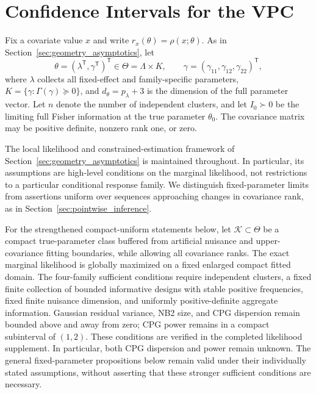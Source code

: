 \section{Confidence Intervals for the VPC}
\label{sec:vpc_confidence}

Fix a covariate value $x$ and write $r_x(\theta)=\rho(x;\theta)$.
As in Section~\ref{sec:geometry_asymptotics}, let
\[
\theta=(\lambda^{\mathsf T},\gamma^{\mathsf T})^{\mathsf T}
\in\Theta=\Lambda\times K,\qquad
\gamma=(\gamma_{11},\gamma_{12},\gamma_{22})^{\mathsf T},
\]
where $\lambda$ collects all fixed-effect and family-specific parameters,
$K=\{\gamma:\Gamma(\gamma)\succeq0\}$, and
$d_\theta=p_\lambda+3$ is the dimension of the full parameter vector.
Let $n$ denote the number of independent clusters, and let $I_0\succ0$
be the limiting full Fisher information at the true parameter $\theta_0$.
The covariance matrix may be positive definite, nonzero rank one, or zero.

The local likelihood and constrained-estimation framework of
Section~\ref{sec:geometry_asymptotics} is maintained throughout.
In particular, its assumptions are high-level conditions on the marginal
likelihood, not restrictions to a particular conditional response family.
We distinguish fixed-parameter limits from assertions uniform over
sequences approaching changes in covariance rank, as in
Section~\ref{sec:pointwise_inference}.

For the strengthened compact-uniform statements below, let
$\mathcal K\subset\Theta$ be a compact true-parameter class buffered
from artificial nuisance and upper-covariance fitting boundaries,
while allowing all covariance ranks. The exact marginal likelihood
is globally maximized on a fixed enlarged compact fitted domain.
The four-family sufficient conditions require independent clusters,
a fixed finite collection of bounded informative designs with stable
positive frequencies, fixed finite nuisance dimension, and uniformly
positive-definite aggregate information. Gaussian residual variance,
NB2 size, and CPG dispersion remain bounded above and away from zero;
CPG power remains in a compact subinterval of $(1,2)$.
These conditions are verified in the completed likelihood supplement.
In particular, both CPG dispersion and power remain unknown.
The general fixed-parameter propositions below remain valid under
their individually stated assumptions, without asserting that these
stronger sufficient conditions are necessary.

